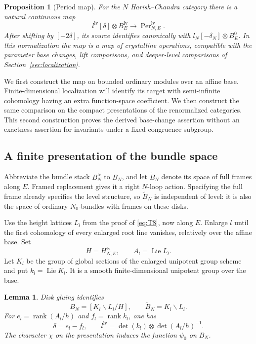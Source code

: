 \documentclass[11pt]{article}
\numberwithin{equation}{section}
\newtheorem{proposition}[theorem]{Proposition}
\newtheorem{lemma}[theorem]{Lemma}
\theoremstyle{definition}
\theoremstyle{remark}
\begin{document}
\begin{proposition}[Period map]\label{prop:unipotent-period}
For the $N$ Harish--Chandra category there is a natural continuous map
\begin{equation}\label{eq:T10}
 l^{\mathrm{lv}}[\delta]\otimes B_E^{\mathrm{lv}}
       \longrightarrow \operatorname{Per}_{N,E}^{\mathrm{lv}}.
\end{equation}
After shifting by $[-2\delta]$, its source identifies canonically with
$l_N[-\delta_N]\otimes B_E^0$.  In this normalization the map is a
map of crystalline operations, compatible with the parameter base
changes, lift comparisons, and deeper-level comparisons of
Section~\ref{sec:localization}.
\end{proposition}

We first construct the map on bounded ordinary modules over an affine
base.  Finite-dimensional localization will identify its target with
semi-infinite cohomology having an extra function-space coefficient.
We then construct the same comparison on the compact presentations of
the renormalized categories.  This second construction proves the
derived base-change assertion without an exactness assertion for
invariants under a fixed congruence subgroup.

\subsection{A finite presentation of the bundle space}

Abbreviate the bundle stack $B_N^{\mathrm{lv}}$ to $B_N$, and let
$\widetilde B_N$ denote its space of full frames along $E$.  Framed
replacement gives it a right $N$-loop action.  Specifying the full
frame already specifies the level structure, so $\widetilde B_N$ is
independent of level: it is also the space of ordinary $N_0$-bundles
with frames on these disks.

Use the height lattices $L_l$ from the proof of \eqref{eq:T8}, now
along $E$.  Enlarge $l$ until the first cohomology of every enlarged
root line vanishes, relatively over the affine base.  Set
\[
 H=H_{N,E}^{\mathrm{lv}},\qquad
 A_l=\operatorname{Lie}L_l.
\]
Let $K_l$ be the group of global sections of the enlarged unipotent
group scheme and put $k_l=\operatorname{Lie}K_l$.  It is a smooth
finite-dimensional unipotent group over the base.

\begin{lemma}\label{lem:unipotent-presentation}
Disk gluing identifies
\begin{equation}\label{eq:T11}
 B_N=[K_l\backslash L_l/H],\qquad
 \widetilde B_N=K_l\backslash L_l.
\end{equation}
For $e_l=\operatorname{rank}(A_l/h)$ and
$f_l=\operatorname{rank}k_l$, one has
\begin{equation}\label{eq:T12}
 \delta=e_l-f_l,\qquad
 l^{\mathrm{lv}}=\det(k_l)\otimes\det(A_l/h)^{-1}.
\end{equation}
The character $\chi$ on the presentation induces the function
$\psi_0$ on $B_N$.
\end{lemma}
\end{document}
